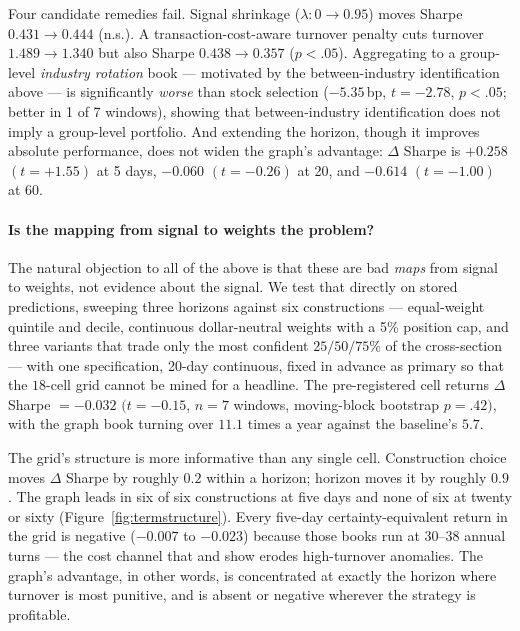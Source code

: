 Four candidate remedies fail. Signal shrinkage ($\lambda: 0 \to 0.95$) moves
Sharpe $0.431 \to 0.444$ (n.s.). A transaction-cost-aware turnover penalty
cuts turnover $1.489 \to 1.340$ but also Sharpe $0.438 \to 0.357$ ($p<.05$).
Aggregating to a group-level \emph{industry rotation} book --- motivated by
the between-industry identification above --- is significantly \emph{worse}
than stock selection ($-5.35$\,bp, $t=-2.78$, $p<.05$; better in 1 of 7
windows), showing that between-industry identification does not imply a
group-level portfolio. And extending the horizon, though it improves
absolute performance, does not widen the graph's advantage:
$\Delta$ Sharpe is $+0.258$ $(t{=}{+}1.55)$ at 5 days, $-0.060$
$(t{=}{-}0.26)$ at 20, and $-0.614$ $(t{=}{-}1.00)$ at 60.

\paragraph{Is the mapping from signal to weights the problem?} The natural
objection to all of the above is that these are bad \emph{maps} from signal
to weights, not evidence about the signal. We test that directly on stored
predictions, sweeping three horizons against six constructions ---
equal-weight quintile and decile, continuous dollar-neutral weights with a
5\% position cap, and three variants that trade only the most confident
$25/50/75\%$ of the cross-section --- with one specification, 20-day
continuous, fixed in advance as primary so that the $18$-cell grid cannot be
mined for a headline. The pre-registered cell returns
$\Delta$ Sharpe $=-0.032$ $(t{=}{-}0.15$, $n{=}7$ windows, moving-block
bootstrap \citep{kunsch1989jackknife} $p=.42)$, with the graph book turning over $11.1$ times a year against the
baseline's $5.7$.

The grid's structure is more informative than any single cell.
Construction choice moves $\Delta$ Sharpe by roughly $0.2$ within a horizon;
horizon moves it by roughly $0.9$. The graph leads in six of six
constructions at five days and none of six at twenty or sixty
(Figure~\ref{fig:termstructure}). Every five-day certainty-equivalent return
in the grid is negative ($-0.007$ to $-0.023$) because those books run at
$30$--$38$ annual turns --- the cost channel that
\citet{novymarx2016taxonomy} and \citet{korajczyk2004momentum} show erodes
high-turnover anomalies. The graph's advantage, in other words, is
concentrated at exactly the horizon where turnover is most punitive, and is
absent or negative wherever the strategy is profitable.

